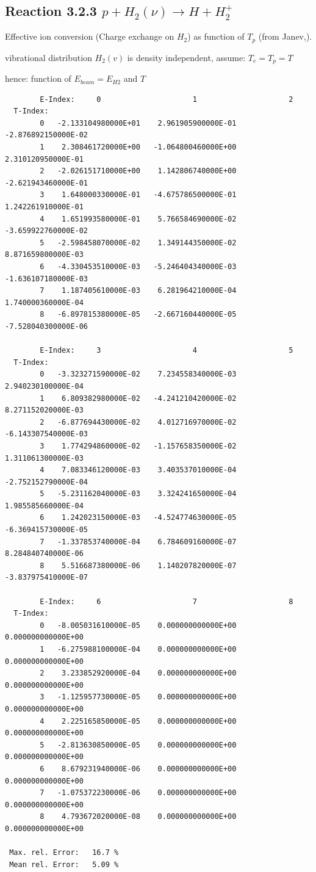 \documentclass[12pt,dvips]{article}
\begin{document}
\subsection{
Reaction 3.2.3  $  p + H_2(\nu) \rightarrow H + H_2^+  $
}
  Effective ion conversion (Charge exchange on $H_2$)
  as function of $T_p$ (from Janev,\cite{kn:Janev}).

  vibrational distribution $H_2(v)$ is density independent, assume: $T_e = T_p = T$

  hence: function of $E_{beam} = E_{H2}$ and $T$
\begin{small}\begin{verbatim}
        E-Index:     0                     1                     2
  T-Index:
        0   -2.133104980000E+01    2.961905900000E-01   -2.876892150000E-02
        1    2.308461720000E+00   -1.064800460000E+00    2.310120950000E-01
        2   -2.026151710000E+00    1.142806740000E+00   -2.621943460000E-01
        3    1.648000330000E-01   -4.675786500000E-01    1.242261910000E-01
        4    1.651993580000E-01    5.766584690000E-02   -3.659922760000E-02
        5   -2.598458070000E-02    1.349144350000E-02    8.871659800000E-03
        6   -4.330453510000E-03   -5.246404340000E-03   -1.636107180000E-03
        7    1.187405610000E-03    6.281964210000E-04    1.740000360000E-04
        8   -6.897815380000E-05   -2.667160440000E-05   -7.528040300000E-06

        E-Index:     3                     4                     5
  T-Index:
        0   -3.323271590000E-02    7.234558340000E-03    2.940230100000E-04
        1    6.809382980000E-02   -4.241210420000E-02    8.271152020000E-03
        2   -6.877694430000E-02    4.012716970000E-02   -6.143307540000E-03
        3    1.774294860000E-02   -1.157658350000E-02    1.311061300000E-03
        4    7.083346120000E-03    3.403537010000E-04   -2.752152790000E-04
        5   -5.231162040000E-03    3.324241650000E-04    1.985585660000E-04
        6    1.242023150000E-03   -4.524774630000E-05   -6.369415730000E-05
        7   -1.337853740000E-04    6.784609160000E-07    8.284840740000E-06
        8    5.516687380000E-06    1.140207820000E-07   -3.837975410000E-07

        E-Index:     6                     7                     8
  T-Index:
        0   -8.005031610000E-05    0.000000000000E+00    0.000000000000E+00
        1   -6.275988100000E-04    0.000000000000E+00    0.000000000000E+00
        2    3.233852920000E-04    0.000000000000E+00    0.000000000000E+00
        3   -1.125957730000E-05    0.000000000000E+00    0.000000000000E+00
        4    2.225165850000E-05    0.000000000000E+00    0.000000000000E+00
        5   -2.813630850000E-05    0.000000000000E+00    0.000000000000E+00
        6    8.679231940000E-06    0.000000000000E+00    0.000000000000E+00
        7   -1.075372230000E-06    0.000000000000E+00    0.000000000000E+00
        8    4.793672020000E-08    0.000000000000E+00    0.000000000000E+00

 Max. rel. Error:   16.7 %
 Mean rel. Error:   5.09 %

\end{verbatim}\end{small}
\end{document}
